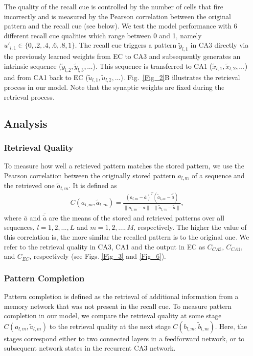 \documentclass[utf8]{frontiersSCNS} %
\begin{document}
The quality of the recall cue is controlled by the number of cells that fire incorrectly and is measured by the Pearson correlation between the original pattern and the recall cue (see below). We test the model performance with $6$ different recall cue qualities which range between 0 and 1, namely $ u'_{l, 1} \in \{ 0, .2, .4, .6, .8, 1 \} $.       
%
The recall cue triggers a pattern $\tilde{y}_{l, 1}$ in CA3 directly via the previously learned weights from EC to CA3 and subsequently generates an intrinsic sequence ($\tilde{y}_{l, 2}, \tilde{y}_{l, 3}, \ldots$). This sequence is transferred to CA1 ($\tilde{x}_{l, 1}, \tilde{x}_{l, 2}, \ldots$) and from CA1 back to EC ($\tilde{u}_{l, 1}, \tilde{u}_{l, 2}, \ldots$). Fig.~\ref{Fig_2}B illustrates the retrieval process in our model. Note that the synaptic weights are fixed during the retrieval process. 

\subsection{Analysis}

\subsubsection{Retrieval Quality}
To measure how well a retrieved pattern matches the stored pattern, we use the Pearson correlation between the originally stored pattern $a_{l, m}$ of a sequence and the retrieved one $\tilde{a}_{l, m}$. It is defined as
\begin{align*}
	C(a_{l, m},\tilde{a}_{l, m})  = \frac{(a_{l, m} -\bar{a})^T(\tilde{a}_{l, m} -\bar{\tilde{a}})}
{\lVert{a_{l, m} -\bar{a}} \rVert \cdot \lVert{\tilde{a}_{l, m} -\bar{\tilde{a}}}\rVert },
\end{align*}     
where $\bar{a}$ and $\bar{\tilde{a}}$ are the means of the stored and retrieved patterns over all sequences, $l = 1,2, ..., L$ and $m = 1,2, ..., M$, respectively. The higher the value of this correlation is, the more similar the recalled pattern is to the original one. We refer to the retrieval quality in CA3, CA1 and the output in EC as $C_{CA3}$, $C_{CA1}$, and $C_{EC}$, respectively (see Figs. \ref{Fig_3} and \ref{Fig_6}).

\subsubsection{Pattern Completion}
Pattern completion is defined as the retrieval of additional information from a memory network that was not present in the recall cue. To measure pattern completion in our model, we compare the retrieval quality at some stage $C(a_{l, m},\tilde{a}_{l, m})$ to the retrieval quality at the next stage $C(b_{l, m},\tilde{b}_{l, m})$. Here, the stages correspond either to two connected layers in a feedforward network, or to subsequent network states in the recurrent CA3 network. 
\end{document}
